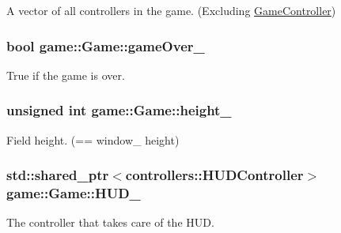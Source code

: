 \-A vector of all controllers in the game. (\-Excluding \hyperlink{classgame_1_1GameController}{\-Game\-Controller}) 

\hypertarget{classgame_1_1Game_ae044e3c64579c11cf381feb6a1e6f544}{
\subsubsection[{game\-Over\-\_\-}]{\setlength{\rightskip}{0pt plus 5cm}bool {\bf game\-::\-Game\-::game\-Over\-\_\-}}}\label{db/d26/classgame_1_1Game_ae044e3c64579c11cf381feb6a1e6f544}


\-True if the game is over. 

\hypertarget{classgame_1_1Game_adaaa88157cd82d0c9b56d16015c6e3af}{
\subsubsection[{height\-\_\-}]{\setlength{\rightskip}{0pt plus 5cm}unsigned int {\bf game\-::\-Game\-::height\-\_\-}}}\label{db/d26/classgame_1_1Game_adaaa88157cd82d0c9b56d16015c6e3af}


\-Field height. (== window\-\_\- height) 

\hypertarget{classgame_1_1Game_a5c8b5c2b457ff969b9b35fa181d97b9e}{
\subsubsection[{\-H\-U\-D\-\_\-}]{\setlength{\rightskip}{0pt plus 5cm}std\-::shared\-\_\-ptr$<${\bf controllers\-::\-H\-U\-D\-Controller}$>$ {\bf game\-::\-Game\-::\-H\-U\-D\-\_\-}}}\label{db/d26/classgame_1_1Game_a5c8b5c2b457ff969b9b35fa181d97b9e}


\-The controller that takes care of the \-H\-U\-D. 

